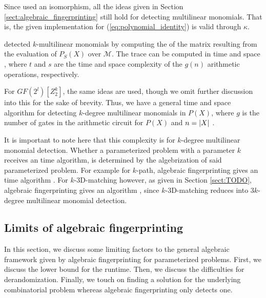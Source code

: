 Since \citeauthor{Koutis08} 
used an isomorphism, all the ideas given in 
Section \ref{sect:algebraic_fingerprinting} still hold for 
detecting multilinear monomials. That is, 
the given implementation for (\ref{eq:polynomial_identity}) is valid through $\kappa$.

\citeauthor{Koutis08} \cite{Koutis08} detected $k$-multilinear monomials 
by computing the  of the matrix resulting 
from the evaluation of $P_S(X)$ over $\mathcal{M}$. The trace can be computed 
in time  and space , where $t$ and $s$ are the time 
and space complexity of the $g(n)$ arithmetic operations, respectively. 

For $GF(2^{l})[Z_2^k]$, the same ideas are used, though we omit 
further discussion into this for the sake of brevity. 
Thus, we have a general 
 time and  space algorithm for detecting 
$k$-degree multilinear monomials in $P(X)$, where $g$ is the number of gates in the 
arithmetic circuit for $P(X)$ and $n = {\left\vert X\right\vert}$ \cite{KouWil09}.

It is important to note here that this complexity is for $k$-degree 
multilinear monomial detection. Whether a parameterized problem with a parameter 
$k$ receives an  time algorithm, is determined by the algebrization 
of said parameterized problem. 
For example for $k$-path, algebraic fingerprinting gives an  
time algorithm \cite{Williams09}. 
For $k$-3D-matching however, as given in Section \ref{sect:TODO}, 
algebraic fingerprinting gives an  algorithm \cite{KouWil15}, since 
$k$-3D-matching reduces into $3k$-degree multilinear monomial detection.




\subsection{Limits of algebraic fingerprinting}
\label{sect:limits}

In this section, we discuss some limiting factors to the general 
algebraic framework given by 
algebraic fingerprinting for parameterized problems. First, 
we discuss the lower bound for the runtime. Then, we discuss 
the difficulties for derandomization. Finally, we touch on 
finding a solution for the underlying combinatorial problem 
whereas algebraic fingerprinting only detects one.

